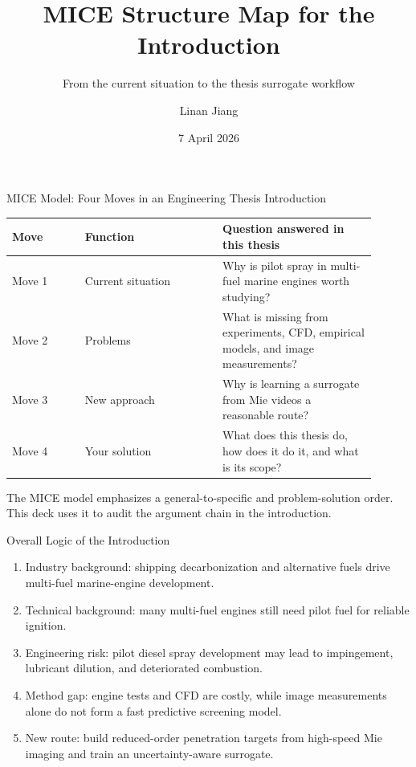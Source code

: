 \documentclass[aspectratio=169,11pt]{beamer}
\title[MICE Introduction Map]{MICE Structure Map for the Introduction}
\subtitle{From the current situation to the thesis surrogate workflow}
\author{Linan Jiang}
\institute{Aalto University}
\date{7 April 2026}
\newcommand{\claim}[1]{\textcolor{blue!65!black}{#1}}
\newcommand{\gaptext}[1]{\textcolor{red!65!black}{#1}}
\newcommand{\solutiontext}[1]{\textcolor{green!45!black}{#1}}
\begin{document}
\begin{frame}
  \titlepage
\end{frame}

\begin{frame}{MICE Model: Four Moves in an Engineering Thesis Introduction}
\small
\begin{tabular}{L{0.18\linewidth}L{0.34\linewidth}L{0.38\linewidth}}
\toprule
Move & Function & Question answered in this thesis \\
\midrule
Move 1 & Current situation & Why is pilot spray in multi-fuel marine engines worth studying? \\
Move 2 & Problems & What is missing from experiments, CFD, empirical models, and image measurements? \\
Move 3 & New approach & Why is learning a surrogate from Mie videos a reasonable route? \\
Move 4 & Your solution & What does this thesis do, how does it do it, and what is its scope? \\
\bottomrule
\end{tabular}

\vspace{0.7em}
\footnotesize
The MICE model emphasizes a general-to-specific and problem-solution order. This deck uses it to audit the argument chain in the introduction.
\end{frame}

\begin{frame}{Overall Logic of the Introduction}
\small
\begin{enumerate}
  \item \claim{Industry background}: shipping decarbonization and alternative fuels drive multi-fuel marine-engine development.
  \item \claim{Technical background}: many multi-fuel engines still need pilot fuel for reliable ignition.
  \item \gaptext{Engineering risk}: pilot diesel spray development may lead to impingement, lubricant dilution, and deteriorated combustion.
  \item \gaptext{Method gap}: engine tests and CFD are costly, while image measurements alone do not form a fast predictive screening model.
  \item \solutiontext{New route}: build reduced-order penetration targets from high-speed Mie imaging and train an uncertainty-aware surrogate.
\end{enumerate}
\end{frame}
\end{document}
